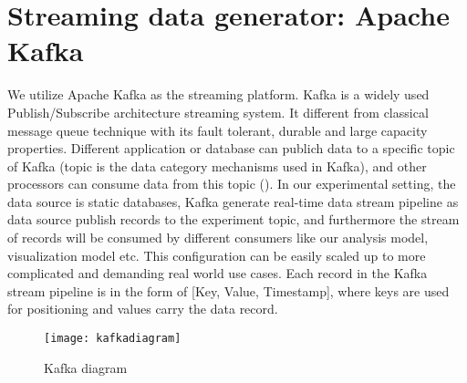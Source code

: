 \section{Streaming data generator: Apache Kafka}
\label{sec:Streaming data generator: Apache Kafka}

We utilize Apache Kafka as the streaming platform. Kafka is a widely used Publish/Subscribe architecture streaming system. It different from classical message queue technique with its fault tolerant, durable and large capacity properties. Different application or database can publich data to a specific topic of Kafka (topic is the data category mechanisms used in Kafka), and other processors can consume data from this topic (). In our experimental setting, the data source is static databases, Kafka generate real-time data stream pipeline as data source publish records to the experiment topic, and furthermore the stream of records will be consumed by different consumers like our analysis model, visualization model etc. This configuration can be easily scaled up to more complicated and demanding real world use cases. Each record in the Kafka stream pipeline is in the form of [Key, Value, Timestamp], where keys are used for positioning and values carry the data record.

\begin{figure}[h]
\centering
\texttt{[image: kafkadiagram]}
\caption[Kafka diagram]{Kafka diagram\footnotemark}
\label{fig:kafkadiagram}
\end{figure}

